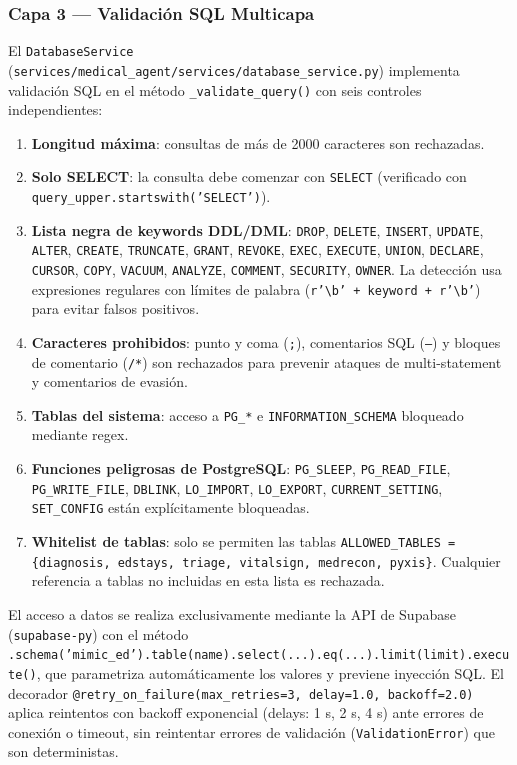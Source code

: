 \subsubsection{Capa 3 — Validación SQL Multicapa}
\label{sec:sql_validation}

El \texttt{DatabaseService} (\texttt{services/medical\_agent/services/database\_service.py}) implementa validación SQL en el método \texttt{\_validate\_query()} con seis controles independientes:

\begin{enumerate}[nosep, leftmargin=*]
  \item \textbf{Longitud máxima}: consultas de más de 2000 caracteres son rechazadas.
  \item \textbf{Solo SELECT}: la consulta debe comenzar con \texttt{SELECT} (verificado con \texttt{query\_upper.startswith('SELECT')}).
  \item \textbf{Lista negra de keywords DDL/DML}: \texttt{DROP}, \texttt{DELETE}, \texttt{INSERT}, \texttt{UPDATE}, \texttt{ALTER}, \texttt{CREATE}, \texttt{TRUNCATE}, \texttt{GRANT}, \texttt{REVOKE}, \texttt{EXEC}, \texttt{EXECUTE}, \texttt{UNION}, \texttt{DECLARE}, \texttt{CURSOR}, \texttt{COPY}, \texttt{VACUUM}, \texttt{ANALYZE}, \texttt{COMMENT}, \texttt{SECURITY}, \texttt{OWNER}. La detección usa expresiones regulares con límites de palabra (\texttt{r'\textbackslash b' + keyword + r'\textbackslash b'}) para evitar falsos positivos.
  \item \textbf{Caracteres prohibidos}: punto y coma (\texttt{;}), comentarios SQL (\texttt{--}) y bloques de comentario (\texttt{/*}) son rechazados para prevenir ataques de multi-statement y comentarios de evasión.
  \item \textbf{Tablas del sistema}: acceso a \texttt{PG\_*} e \texttt{INFORMATION\_SCHEMA} bloqueado mediante regex.
  \item \textbf{Funciones peligrosas de PostgreSQL}: \texttt{PG\_SLEEP}, \texttt{PG\_READ\_FILE}, \texttt{PG\_WRITE\_FILE}, \texttt{DBLINK}, \texttt{LO\_IMPORT}, \texttt{LO\_EXPORT}, \texttt{CURRENT\_SETTING}, \texttt{SET\_CONFIG} están explícitamente bloqueadas.
  \item \textbf{Whitelist de tablas}: solo se permiten las tablas \texttt{ALLOWED\_TABLES = \{diagnosis, edstays, triage, vitalsign, medrecon, pyxis\}}. Cualquier referencia a tablas no incluidas en esta lista es rechazada.
\end{enumerate}

El acceso a datos se realiza exclusivamente mediante la API de Supabase (\texttt{supabase-py}) con el método \texttt{.schema('mimic\_ed').table(name).select(...).eq(...).limit(limit).execute()}, que parametriza automáticamente los valores y previene inyección SQL. El decorador \texttt{@retry\_on\_failure(max\_retries=3, delay=1.0, backoff=2.0)} aplica reintentos con backoff exponencial (delays: 1 s, 2 s, 4 s) ante errores de conexión o timeout, sin reintentar errores de validación (\texttt{ValidationError}) que son deterministas.


